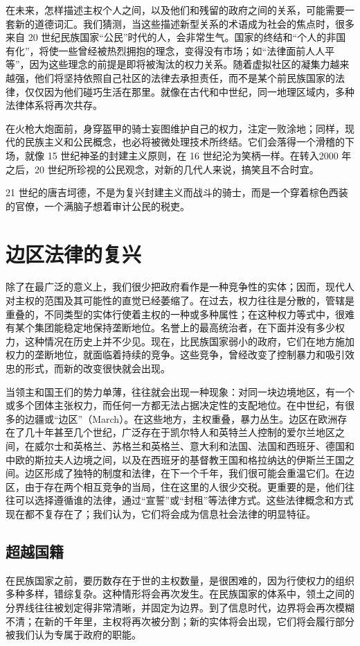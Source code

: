 在未来，怎样描述主权个人之间，以及他们和残留的政府之间的关系，可能需要一套新的道德词汇。我们猜测，当这些描述新型关系的术语成为社会的焦点时，很多来自 20 世纪民族国家“公民”时代的人，会非常生气。国家的终结和“个人的非国有化”，将使一些曾经被热烈拥抱的理念，变得没有市场；如“法律面前人人平等”，因为这些理念的前提是即将被淘汰的权力关系。随着虚拟社区的凝集力越来越强，他们将坚持依照自己社区的法律去承担责任，而不是某个前民族国家的法律，仅仅因为他们碰巧生活在那里。就像在古代和中世纪，同一地理区域内，多种法律体系将再次共存。


在火枪大炮面前，身穿盔甲的骑士妄图维护自己的权力，注定一败涂地；同样，现代的民族主义和公民概念，也必将被微处理技术所终结。它们会落得一个滑稽的下场，就像 15 世纪神圣的封建主义原则，在 16 世纪沦为笑柄一样。在转入2000 年之后，20 世纪所珍视的公民观念，对新的几代人来说，搞笑且不合时宜。


21 世纪的唐吉坷德，不是为复兴封建主义而战斗的骑士，而是一个穿着棕色西装的官僚，一个满脑子想着审计公民的税吏。


\section{边区法律的复兴}
除了在最广泛的意义上，我们很少把政府看作是一种竞争性的实体；因而，现代人对主权的范围及其可能性的直觉已经萎缩了。在过去，权力往往是分散的，管辖是重叠的，不同类型的实体行使着主权的一种或多种属性；在这种权力等式中，很难有某个集团能稳定地保持垄断地位。名誉上的最高统治者，在下面并没有多少权力，这种情况在历史上并不少见。现在，比民族国家弱小的政府，它们在地方施加权力的垄断地位，就面临着持续的竞争。这些竞争，曾经改变了控制暴力和吸引效忠的形式，而新的改变很快就会出现。


当领主和国王们的势力单薄，往往就会出现一种现象：对同一块边境地区，有一个或多个团体主张权力，而任何一方都无法占据决定性的支配地位。在中世纪，有很多的边疆或“边区”（March）。在这些地方，主权重叠，暴力丛生。边区在欧洲存在了几十年甚至几个世纪，广泛存在于凯尔特人和英特兰人控制的爱尔兰地区之间，在威尔士和英格兰、苏格兰和英格兰、意大利和法国、法国和西班牙、德国和中欧的斯拉夫人边境之间，以及在西班牙的基督教王国和格拉纳达的伊斯兰王国之间。边区形成了独特的制度和法律，在下一个千年，我们很可能会重温它们。在边区，由于存在两个相互竞争的当局，住在这里的人很少交税。更重要的是，他们往往可以选择遵循谁的法律，通过“宣誓”或“封租”等法律方式。这些法律概念和方式现在都不复存在了；我们认为，它们将会成为信息社会法律的明显特征。


\subsection{超越国籍}
在民族国家之前，要历数存在于世的主权数量，是很困难的，因为行使权力的组织多种多样，错综复杂。这种情形将会再次发生。在民族国家的体系中，领土之间的分界线往往被划定得非常清晰，并固定为边界。到了信息时代，边界将会再次模糊不清；在新的千年里，主权将再次被分割；新的实体将会出现，它们将会履行部分被我们认为专属于政府的职能。


